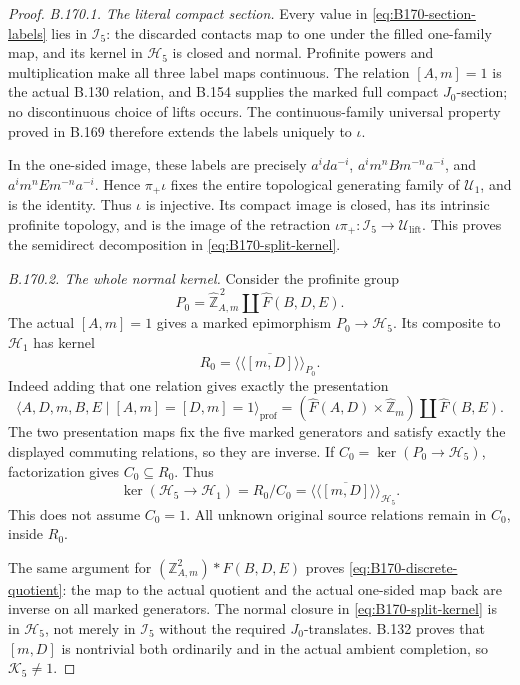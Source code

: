 \begin{proof}
\emph{B.170.1. The literal compact section.}
Every value in \eqref{eq:B170-section-labels} lies in \(\mathcal I_5\):
the discarded contacts map to one under the filled one-family map, and
its kernel in \(\mathcal H_5\) is closed and normal. Profinite powers and
multiplication make all three label maps continuous. The relation
\([A,m]=1\) is the actual B.130 relation, and B.154 supplies the marked
full compact \(J_0\)-section; no discontinuous choice of lifts occurs.
The continuous-family universal property proved in B.169 therefore
extends the labels uniquely to \(\iota\).

In the one-sided image, these labels are precisely
\(a^ida^{-i}\), \(a^im^nBm^{-n}a^{-i}\), and
\(a^im^nEm^{-n}a^{-i}\). Hence \(\pi_+\iota\) fixes the entire
topological generating family of \(\mathcal U_1\), and is the identity.
Thus \(\iota\) is injective. Its compact image is closed, has its intrinsic
profinite topology, and is the image of the retraction
\(\iota\pi_+:\mathcal I_5\to\mathcal U_{\mathrm{lift}}\).
This proves the semidirect decomposition in
\eqref{eq:B170-split-kernel}.

\emph{B.170.2. The whole normal kernel.}
Consider the profinite group
\[
 P_0=\widehat{\mathbb Z}^{\,2}_{A,m}
             \amalg\widehat F(B,D,E).
\]
The actual \([A,m]=1\) gives a marked epimorphism
\(P_0\to\mathcal H_5\). Its composite to \(\mathcal H_1\)
has kernel
\[
 R_0=\overline{\langle\!\langle[m,D]\rangle\!\rangle}_{P_0}.
\]
Indeed adding that one relation gives exactly the presentation
\[
 \langle A,D,m,B,E\mid[A,m]=[D,m]=1\rangle_{\mathrm{prof}}
   =(\widehat F(A,D)\times\widehat{\mathbb Z}_m)
          \amalg\widehat F(B,E).
\]
The two presentation maps fix the five marked generators and satisfy
exactly the displayed commuting relations, so they are inverse.
If \(C_0=\ker(P_0\to\mathcal H_5)\), factorization gives
\(C_0\subseteq R_0\). Thus
\[
 \ker(\mathcal H_5\to\mathcal H_1)=R_0/C_0
   =\overline{\langle\!\langle[m,D]\rangle\!\rangle}_{\mathcal H_5}.
\]
This does not assume \(C_0=1\). All unknown original source relations
remain in \(C_0\), inside \(R_0\).

The same argument for
\((\mathbb Z^2_{A,m})*F(B,D,E)\) proves
\eqref{eq:B170-discrete-quotient}: the map to the actual quotient and the
actual one-sided map back are inverse on all marked generators.
The normal closure in \eqref{eq:B170-split-kernel} is in
\(\mathcal H_5\), not merely in \(\mathcal I_5\) without the required
\(J_0\)-translates. B.132 proves that \([m,D]\) is nontrivial both
ordinarily and in the actual ambient completion, so \(\mathcal K_5\ne1\).


\end{proof}
